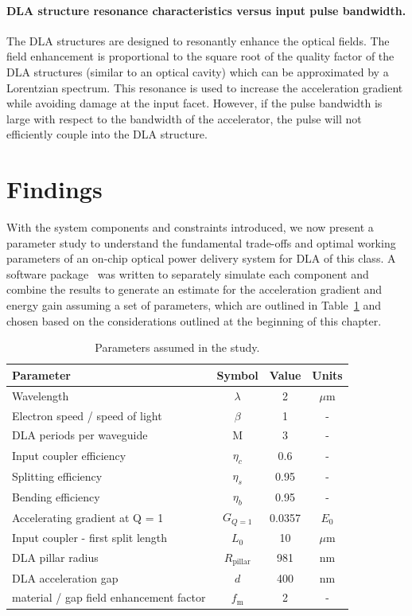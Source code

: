 \paragraph{DLA structure resonance characteristics versus input pulse bandwidth.}The DLA structures are designed to resonantly enhance the optical fields. The field enhancement is proportional to the square root of the quality factor of the DLA structures (similar to an optical cavity) which can be approximated by a Lorentzian spectrum.  This resonance is used to increase the acceleration gradient while avoiding damage at the input facet. However, if the pulse bandwidth is large with respect to the bandwidth of the accelerator, the pulse will not efficiently couple into the DLA structure.

\section{\label{sec:param}Findings}
With the system components and constraints introduced, we now present a parameter study to understand the fundamental trade-offs and optimal working parameters of an on-chip optical power delivery system for DLA of this class.  A software package~\cite{hughes2017github} was written to separately simulate each component and combine the results to generate an estimate for the acceleration gradient and energy gain assuming a set of parameters, which are outlined in Table~\ref{tab:params} and chosen based on the considerations outlined at the beginning of this chapter.

\begin{table}[htb]
\caption{\label{tab:params} Parameters assumed in the study.}
\centering
\begin{tabular}{lccc}
\hline
Parameter & Symbol & Value & Units \\
\hline
Wavelength & $\lambda$ & 2 & $\mu$m \\
Electron speed / speed of light & $\beta$ & 1 & - \\
DLA periods per waveguide & M & 3 & - \\
Input coupler efficiency & $\eta_c$ & 0.6 & - \\
Splitting efficiency & $\eta_s$ & 0.95 & - \\
Bending efficiency & $\eta_b$ & 0.95 & - \\
Accelerating gradient at Q = 1 & $G_{Q=1}$ & 0.0357 & $E_0$ \\
Input coupler - first split length & $L_0$ & 10 & $\mu$m \\
DLA pillar radius & $R_{\textrm{pillar}}$ & 981 & nm \\
DLA acceleration gap & $d$ & 400 & nm \\
material / gap field enhancement factor & $f_\textrm{m}$ & 2 & - \\
\hline
\end{tabular}
\end{table}

